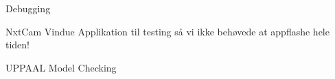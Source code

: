 

Debugging

NxtCam Vindue Applikation til testing så vi ikke behøvede at appflashe hele tiden!

UPPAAL Model Checking

